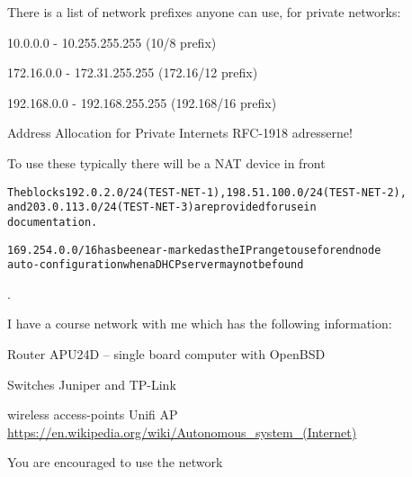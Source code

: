 \documentclass[Screen16to9,17pt]{foils}
\begin{document}

\begin{list1}
\item There is a list of network prefixes anyone can use, for private networks:
\begin{list2}
\item 10.0.0.0    -  10.255.255.255  (10/8 prefix)
\item 172.16.0.0  -  172.31.255.255  (172.16/12 prefix)
\item 192.168.0.0 -  192.168.255.255 (192.168/16 prefix)
\end{list2}
\item Address Allocation for Private Internets RFC-1918 adresserne!
\item To use these typically there will be a NAT device in front
\end{list1}

\begin{alltt}
The blocks 192.0.2.0/24 (TEST-NET-1), 198.51.100.0/24 (TEST-NET-2),
and 203.0.113.0/24 (TEST-NET-3) are provided for use in
documentation.

169.254.0.0/16 has been ear-marked as the IP range to use for end node
auto-configuration when a DHCP server may not be found
\end{alltt}



.

\begin{list1}
\item I have a course network with me which has the following information:
\begin{list2}
\item Router APU24D -- single board computer with OpenBSD
\item Switches Juniper and TP-Link
\item wireless access-points Unifi AP
\url{https://en.wikipedia.org/wiki/Autonomous_system_(Internet)}

\end{list2}
\end{list1}

You are encouraged to use the network
\end{document}
